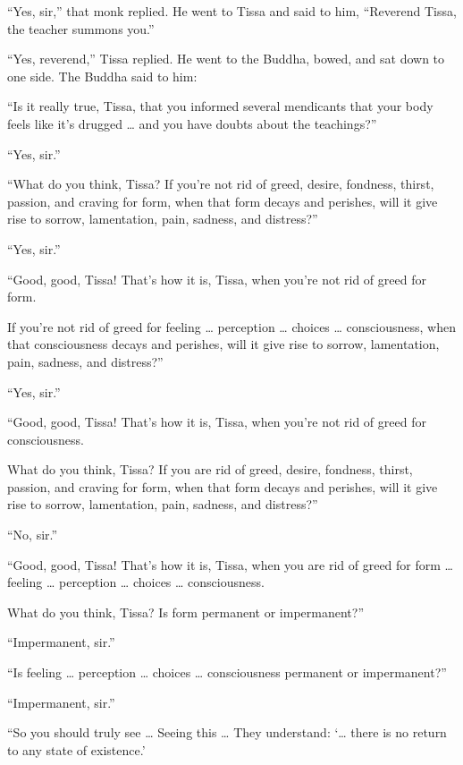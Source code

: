 \documentclass[12pt,openany]{book}%
\begin{document}
“Yes, sir,” that monk replied. He went to Tissa and said to him, “Reverend Tissa, the teacher summons you.” 

“Yes, reverend,” Tissa replied. He went to the Buddha, bowed, and sat down to one side. The Buddha said to him: 

“Is it really true, Tissa, that you informed several mendicants that your body feels like it’s drugged … and you have doubts about the teachings?” 

“Yes, sir.” 

“What do you think, Tissa? If you’re not rid of greed, desire, fondness, thirst, passion, and craving for form, when that form decays and perishes, will it give rise to sorrow, lamentation, pain, sadness, and distress?” 

“Yes, sir.” 

“Good, good, Tissa! That’s how it is, Tissa, when you’re not rid of greed for form. 

If you’re not rid of greed for feeling … perception … choices … consciousness, when that consciousness decays and perishes, will it give rise to sorrow, lamentation, pain, sadness, and distress?” 

“Yes, sir.” 

“Good, good, Tissa! That’s how it is, Tissa, when you’re not rid of greed for consciousness. 

What do you think, Tissa? If you are rid of greed, desire, fondness, thirst, passion, and craving for form, when that form decays and perishes, will it give rise to sorrow, lamentation, pain, sadness, and distress?” 

“No, sir.” 

“Good, good, Tissa! That’s how it is, Tissa, when you are rid of greed for form … feeling … perception … choices … consciousness. 

What do you think, Tissa? Is form permanent or impermanent?” 

“Impermanent, sir.” 

“Is feeling … perception … choices … consciousness permanent or impermanent?” 

“Impermanent, sir.” 

“So you should truly see … Seeing this … They understand: ‘… there is no return to any state of existence.’ 
\end{document}
